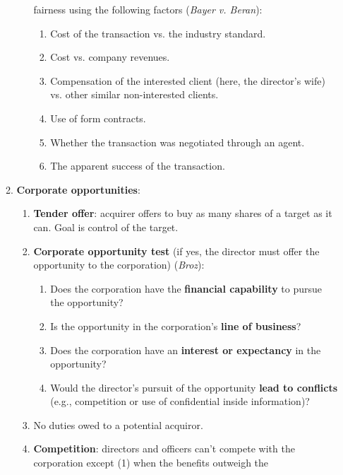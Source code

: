 \begin{enumerate}
\begin{enumerate}
\begin{enumerate}
            fairness using the following factors (\emph{Bayer v. Beran}): %
            \begin{enumerate}
                \item Cost of the transaction vs. the industry standard.
                \item Cost vs. company revenues.
                \item Compensation of the interested client (here, the 
                director's wife) vs. other similar non-interested clients.
                \item Use of form contracts.
                \item Whether the transaction was negotiated through an agent.
                \item The apparent success of the transaction.
            \end{enumerate}
        \end{enumerate}
        \item \textbf{Corporate opportunities}:
        \begin{enumerate}
            \item \textbf{Tender offer}: acquirer offers to buy as many shares 
            of a target as it can. Goal is control of the target.
            \item \textbf{Corporate opportunity test} (if yes, the director 
            must offer the opportunity to the corporation) (\emph{Broz}): %
            \begin{enumerate}
                \item Does the corporation have the \textbf{financial 
                capability} to pursue the opportunity?
                \item Is the opportunity in the corporation's \textbf{line of 
                business}?
                \item Does the corporation have an \textbf{interest or 
                expectancy} in the opportunity?
                \item Would the director's pursuit of the opportunity 
                \textbf{lead to conflicts} (e.g., competition or use of 
                confidential inside information)?
            \end{enumerate}
            \item No duties owed to a potential acquiror.
            \item \textbf{Competition}: directors and officers can't compete 
            with the corporation except (1) when the benefits outweigh the 

\end{enumerate}
\end{enumerate}
\end{enumerate}
